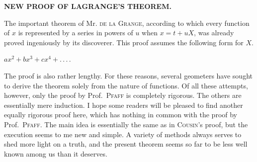 \clearpage
{}
\begin{center}
\textbf{NEW PROOF OF LAGRANGE'S THEOREM.}
\end{center}

\noindent\hspace*{\parindent}The important theorem of Mr. \textsc{de la Grange}, according to which every function of
$x$ is represented by a series in powers of $u$ when $x=t+uX$,
was already proved ingeniously by its discoverer.
This proof assumes the following form for $X$.
\begin{center}
$\displaystyle ax^2+bx^3+cx^4+.\,.\,.\,.$
\end{center}
\noindent The proof is also rather lengthy. For these reasons, several geometers have sought
to derive the theorem solely from the nature of functions.
Of all these attempts, however, only the proof by Prof.\ \textsc{Pfaff} is completely
rigorous. The others are essentially mere induction. I hope some readers will
be pleased to find another equally rigorous proof here, which has nothing in
common with the proof by Prof.\ \textsc{Pfaff}. The main idea is essentially
the same as in \textsc{Cousin}'s proof, but the execution seems to me new and
simple. A variety of methods always serves to shed more light on a truth, and
the present theorem seems so far to be less well known among us than it deserves.

